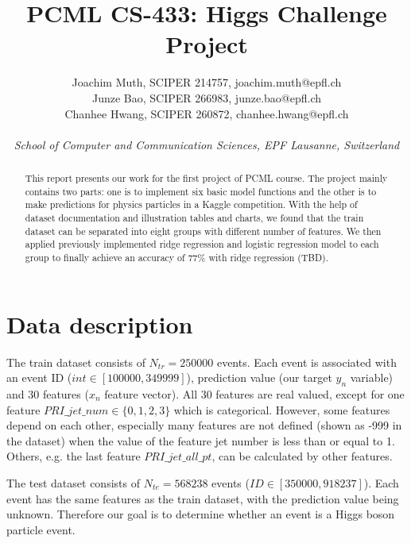 \documentclass[10pt,conference,compsocconf]{IEEEtran}
\begin{document}
\title{PCML CS-433: Higgs Challenge Project}

\author{
  Joachim Muth, SCIPER 214757, joachim.muth@epfl.ch\\
  Junze Bao, SCIPER 266983, junze.bao@epfl.ch\\
  Chanhee Hwang, SCIPER 260872, chanhee.hwang@epfl.ch\\ \\
  \textit{School of Computer and Communication Sciences, EPF Lausanne, Switzerland}
}

\maketitle

\begin{abstract}
This report presents our work for the first project of PCML course. The project mainly contains two parts: one is to implement six basic model functions and the other is to make predictions for physics particles in a Kaggle competition. With the help of dataset documentation and illustration tables and charts, we found that the train dataset can be separated into eight groups with different number of features. We then applied previously implemented ridge regression and logistic regression model to each group to finally achieve an accuracy of {\color{red} 77\% with ridge regression (TBD)}.
\end{abstract}

\section{Data description}
The train dataset consists of $N_{tr} = 250000$ events. Each event is associated with an event ID ($int \in [100000, 349999]$), prediction value (our target \textbf{$y_n$} variable) and 30 features (\textbf{$x_n$} feature vector). All 30 features are real valued, except for one feature $PRI\_jet\_num \in \{0, 1, 2, 3\}$ which is categorical. However, some features depend on each other, especially many features are not defined (shown as -999 in the dataset) when the value of the feature jet number is less than or equal to 1. Others, e.g. the last feature $PRI\_jet\_all\_pt$, can be calculated by other features.

The test dataset consists of $N_{te} = 568238$ events ($ID \in [350000, 918237]$). Each event has the same features as the train dataset, with the prediction value being unknown. Therefore our goal is to determine whether an event is a Higgs boson particle event.
\end{document}
